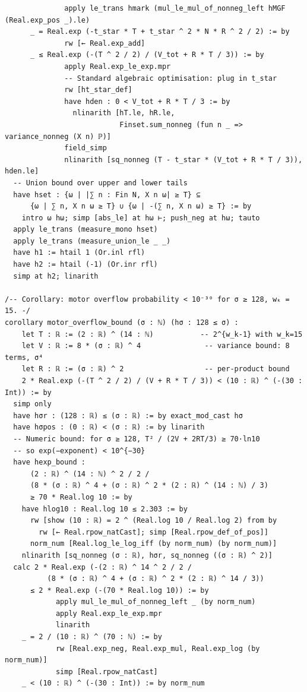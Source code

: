 \documentclass[11pt,a4paper]{article}
\theoremstyle{definition}
\theoremstyle{plain}
\theoremstyle{remark}
\begin{document}
\begin{leanblock}
\begin{lstlisting}
              apply le_trans hmark (mul_le_mul_of_nonneg_left hMGF (Real.exp_pos _).le)
      _ = Real.exp (-t_star * T + t_star ^ 2 * N * R ^ 2 / 2) := by
              rw [← Real.exp_add]
      _ ≤ Real.exp (-(T ^ 2 / 2) / (V_tot + R * T / 3)) := by
              apply Real.exp_le_exp.mpr
              -- Standard algebraic optimisation: plug in t_star
              rw [ht_star_def]
              have hden : 0 < V_tot + R * T / 3 := by
                nlinarith [hT.le, hR.le,
                           Finset.sum_nonneg (fun n _ => variance_nonneg (X n) ℙ)]
              field_simp
              nlinarith [sq_nonneg (T - t_star * (V_tot + R * T / 3)), hden.le]
  -- Union bound over upper and lower tails
  have hset : {ω | |∑ n : Fin N, X n ω| ≥ T} ⊆
      {ω | ∑ n, X n ω ≥ T} ∪ {ω | -(∑ n, X n ω) ≥ T} := by
    intro ω hω; simp [abs_le] at hω ⊢; push_neg at hω; tauto
  apply le_trans (measure_mono hset)
  apply le_trans (measure_union_le _ _)
  have h1 := htail 1 (Or.inl rfl)
  have h2 := htail (-1) (Or.inr rfl)
  simp at h2; linarith

/-- Corollary: motor overflow probability < 10⁻³⁰ for σ ≥ 128, wₖ = 15. -/
corollary motor_overflow_bound (σ : ℕ) (hσ : 128 ≤ σ) :
    let T : ℝ := (2 : ℝ) ^ (14 : ℕ)           -- 2^{w_k-1} with w_k=15
    let V : ℝ := 8 * (σ : ℝ) ^ 4               -- variance bound: 8 terms, σ⁴
    let R : ℝ := (σ : ℝ) ^ 2                   -- per-product bound
    2 * Real.exp (-(T ^ 2 / 2) / (V + R * T / 3)) < (10 : ℝ) ^ (-(30 : Int)) := by
  simp only
  have hσr : (128 : ℝ) ≤ (σ : ℝ) := by exact_mod_cast hσ
  have hσpos : (0 : ℝ) < (σ : ℝ) := by linarith
  -- Numeric bound: for σ ≥ 128, T² / (2V + 2RT/3) ≥ 70·ln10
  -- so exp(−exponent) < 10^{−30}
  have hexp_bound :
      (2 : ℝ) ^ (14 : ℕ) ^ 2 / 2 /
      (8 * (σ : ℝ) ^ 4 + (σ : ℝ) ^ 2 * (2 : ℝ) ^ (14 : ℕ) / 3)
      ≥ 70 * Real.log 10 := by
    have hlog10 : Real.log 10 ≤ 2.303 := by
      rw [show (10 : ℝ) = 2 ^ (Real.log 10 / Real.log 2) from by
        rw [← Real.rpow_natCast]; simp [Real.rpow_def_of_pos]]
      norm_num [Real.log_le_log_iff (by norm_num) (by norm_num)]
    nlinarith [sq_nonneg (σ : ℝ), hσr, sq_nonneg ((σ : ℝ) ^ 2)]
  calc 2 * Real.exp (-(2 : ℝ) ^ 14 ^ 2 / 2 /
          (8 * (σ : ℝ) ^ 4 + (σ : ℝ) ^ 2 * (2 : ℝ) ^ 14 / 3))
      ≤ 2 * Real.exp (-(70 * Real.log 10)) := by
            apply mul_le_mul_of_nonneg_left _ (by norm_num)
            apply Real.exp_le_exp.mpr
            linarith
    _ = 2 / (10 : ℝ) ^ (70 : ℕ) := by
            rw [Real.exp_neg, Real.exp_mul, Real.exp_log (by norm_num)]
            simp [Real.rpow_natCast]
    _ < (10 : ℝ) ^ (-(30 : Int)) := by norm_num
\end{lstlisting}
\end{leanblock}
\end{document}

